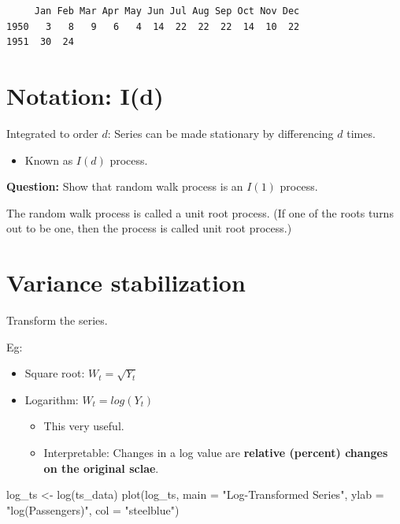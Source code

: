 \documentclass[
  11pt,
  a4paper,
]{report}
\newenvironment{Shaded}{\begin{snugshade}}{\end{snugshade}}
\newcommand{\AttributeTok}[1]{\textcolor[rgb]{0.40,0.45,0.13}{#1}}
\newcommand{\FunctionTok}[1]{\textcolor[rgb]{0.28,0.35,0.67}{#1}}
\newcommand{\NormalTok}[1]{\textcolor[rgb]{0.00,0.23,0.31}{#1}}
\newcommand{\OtherTok}[1]{\textcolor[rgb]{0.00,0.23,0.31}{#1}}
\newcommand{\StringTok}[1]{\textcolor[rgb]{0.13,0.47,0.30}{#1}}
\providecommand{\tightlist}{%
  \setlength{\itemsep}{0pt}\setlength{\parskip}{0pt}}\usepackage{longtable,booktabs,array}
\begin{document}
\begin{verbatim}
     Jan Feb Mar Apr May Jun Jul Aug Sep Oct Nov Dec
1950   3   8   9   6   4  14  22  22  22  14  10  22
1951  30  24                                        
\end{verbatim}

\section{Notation: I(d)}\label{notation-id}

Integrated to order \(d\): Series can be made stationary by differencing
\(d\) times.

\begin{itemize}
\tightlist
\item
  Known as \(I(d)\) process.
\end{itemize}

\textbf{Question:} Show that random walk process is an \(I(1)\) process.

The random walk process is called a unit root process. (If one of the
roots turns out to be one, then the process is called unit root
process.)

\section{Variance stabilization}\label{variance-stabilization}

Transform the series.

Eg:

\begin{itemize}
\item
  Square root: \(W_t = \sqrt{Y_t}\)
\item
  Logarithm: \(W_t = log({Y_t})\)

  \begin{itemize}
  \item
    This very useful.
  \item
    Interpretable: Changes in a log value are \textbf{relative (percent)
    changes on the original sclae}.
  \end{itemize}
\end{itemize}

\begin{Shaded}
\begin{Highlighting}[]
\NormalTok{log\_ts }\OtherTok{\textless{}{-}} \FunctionTok{log}\NormalTok{(ts\_data)}
\FunctionTok{plot}\NormalTok{(log\_ts, }\AttributeTok{main =} \StringTok{"Log{-}Transformed Series"}\NormalTok{, }\AttributeTok{ylab =} \StringTok{"log(Passengers)"}\NormalTok{, }\AttributeTok{col =} \StringTok{"steelblue"}\NormalTok{)}
\end{Highlighting}
\end{Shaded}
\end{document}
